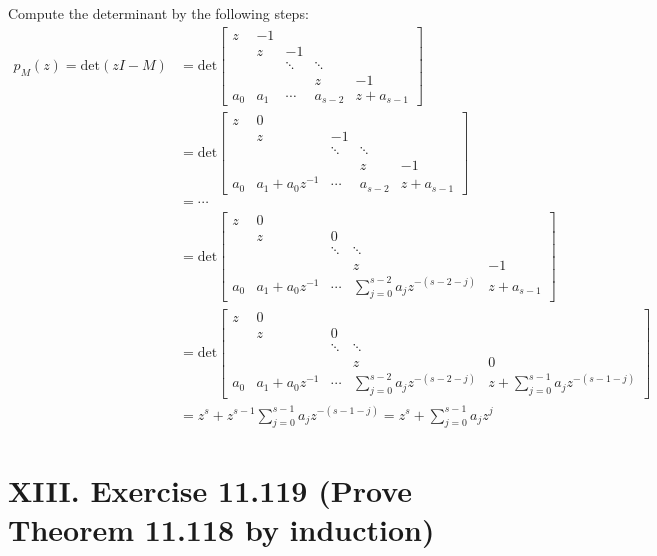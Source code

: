 \documentclass[twoside,a4paper]{article}
\begin{document}
\;\;\;\; Compute the determinant by the following steps:
\begin{align*}
    p_M(z)=\text{det}(zI-M)&=\text{det}\begin{bmatrix}
        z & -1\\
        & z & -1\\
        & & \ddots & \ddots \\
        & & & z & -1\\
        a_0 & a_1 & \cdots & a_{s-2} & z+a_{s-1}
    \end{bmatrix}\\
    &=\text{det}\begin{bmatrix}
        z & 0\\
        & z & -1\\
        & & \ddots & \ddots \\
        & & & z & -1\\
        a_0 & a_1+a_0z^{-1} & \cdots & a_{s-2} & z+a_{s-1}
    \end{bmatrix}\\
    &= \cdots\\
    &=\text{det}\begin{bmatrix}
        z & 0\\
        & z & 0\\
        & & \ddots & \ddots \\
        & & & z & -1\\
        a_0 & a_1+a_0z^{-1} & \cdots & \sum_{j=0}^{s-2}a_jz^{-(s-2-j)} & z+a_{s-1}
    \end{bmatrix}\\
    &=\text{det}\begin{bmatrix}
        z & 0\\
        & z & 0\\
        & & \ddots & \ddots \\
        & & & z & 0\\
        a_0 & a_1+a_0z^{-1} & \cdots & \sum_{j=0}^{s-2}a_jz^{-(s-2-j)} & z+\sum_{j=0}^{s-1}a_jz^{-(s-1-j)}
    \end{bmatrix}\\
    &= z^s + z^{s-1}\sum_{j=0}^{s-1}a_jz^{-(s-1-j)}= z^s+\sum_{j=0}^{s-1}a_jz^{j}
\end{align*}

\section*{XIII. Exercise 11.119 (Prove Theorem 11.118 by induction)}
\end{document}
